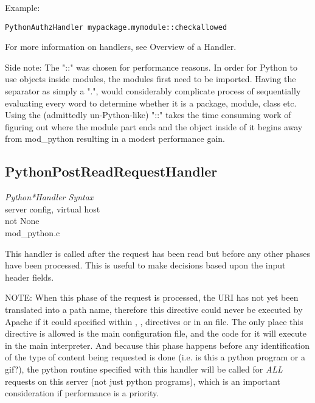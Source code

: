 Example: 

\begin{verbatim}
PythonAuthzHandler mypackage.mymodule::checkallowed
\end{verbatim}

For more information on handlers, see Overview of a Handler.

Side note: The "::" was chosen for performance reasons. In order for
Python to use objects inside modules, the modules first need to be
imported. Having the separator as simply a ".", would considerably
complicate process of sequentially evaluating every word to determine
whether it is a package, module, class etc. Using the (admittedly
un-Python-like) "::" takes the time consuming work of figuring out
where the module part ends and the object inside of it begins away
from mod_python resulting in a modest performance gain.

\subsection{PythonPostReadRequestHandler\label{dir-handlers-prrh}}

\emph{Python*Handler Syntax}\\
server config, virtual host\\
not None\\
mod_python.c

This handler is called after the request has been read but before any
other phases have been processed. This is useful to make decisions
based upon the input header fields.

NOTE: When this phase of the request is processed, the URI has not yet
been translated into a path name, therefore this directive could never
be executed by Apache if it could specified within ,
,  directives or in an 
file. The only place this directive is allowed is the main
configuration file, and the code for it will execute in the main
interpreter. And because this phase happens before any identification
of the type of content being requested is done (i.e. is this a python
program or a gif?), the python routine specified with this handler
will be called for \emph{ALL} requests on this server (not just python
programs), which is an important consideration if performance is a
priority.

